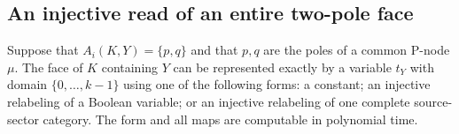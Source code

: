 \subsection{An injective read of an entire two-pole face}

\begin{lemma}
\label{gen:complete-read}
Suppose that $A_i(K,Y)=\{p,q\}$ and that $p,q$ are the poles of a
common P-node $\mu$.  The face of $K$ containing $Y$ can be represented
exactly by a variable $t_Y$ with domain $\{0,\ldots,k-1\}$ using one of
the following forms: a constant; an injective relabeling of a Boolean
variable; or an injective relabeling of one complete source-sector
category.  The form and all maps are computable in polynomial time.
\end{lemma}

